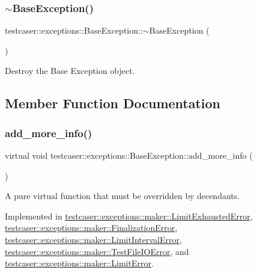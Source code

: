 \subsubsection{\texorpdfstring{$\sim$BaseException()}{~BaseException()}}
{\footnotesize\ttfamily testcaser\+::exceptions\+::\+Base\+Exception\+::$\sim$\+Base\+Exception (\begin{DoxyParamCaption}{ }\end{DoxyParamCaption})\hspace{0.3cm}{\ttfamily [inline]}}



Destroy the Base Exception object. 



\subsection{Member Function Documentation}
\mbox{\label{classtestcaser_1_1exceptions_1_1BaseException_ad607ea04e2cb4ad9b8d0e2e6b6734f2f}} 
\subsubsection{\texorpdfstring{add\_more\_info()}{add\_more\_info()}}
{\footnotesize\ttfamily virtual void testcaser\+::exceptions\+::\+Base\+Exception\+::add\+\_\+more\+\_\+info (\begin{DoxyParamCaption}{ }\end{DoxyParamCaption})\hspace{0.3cm}{\ttfamily [pure virtual]}}



A pure virtual function that must be overridden by decendants. 



Implemented in \mbox{\hyperlink{classtestcaser_1_1exceptions_1_1maker_1_1LimitExhaustedError_a40beeee091c1d5a35a12d6ab974c0895}{testcaser\+::exceptions\+::maker\+::\+Limit\+Exhausted\+Error}}, \mbox{\hyperlink{classtestcaser_1_1exceptions_1_1maker_1_1FinalizationError_a2e0aee4c53427abcbbcf3d5704687d76}{testcaser\+::exceptions\+::maker\+::\+Finalization\+Error}}, \mbox{\hyperlink{classtestcaser_1_1exceptions_1_1maker_1_1LimitIntervalError_a6a050ee23517e8dcb6477011b4a5e406}{testcaser\+::exceptions\+::maker\+::\+Limit\+Interval\+Error}}, \mbox{\hyperlink{classtestcaser_1_1exceptions_1_1maker_1_1TestFileIOError_ab83e748d26f860c9b045535447a383c5}{testcaser\+::exceptions\+::maker\+::\+Test\+File\+I\+O\+Error}}, and \mbox{\hyperlink{classtestcaser_1_1exceptions_1_1maker_1_1LimitError_adb0f0c92f0d78b26f4310301f97bff3a}{testcaser\+::exceptions\+::maker\+::\+Limit\+Error}}.

